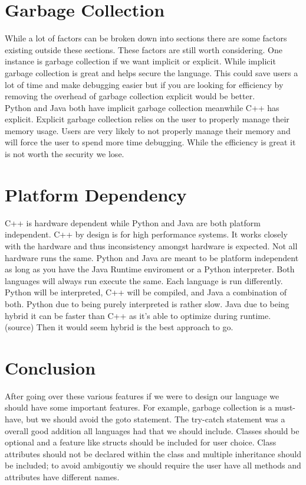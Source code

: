 \documentclass[sigconf, nonacm, authorversion, language=english, 12pt]{acmart}
\def\tab{\hspace*{5mm}}
\begin{document}
\section{Garbage Collection}

\tab While a lot of factors can be broken down into sections there are some factors existing outside these sections. These
factors are still worth considering. One instance is garbage collection if we want implicit or explicit. While implicit
garbage collection is great and helps secure the language. This could save users a lot of time and make debugging easier
but if you are looking for efficiency by removing the overhead of garbage collection explicit would be better.\\

\tab Python and Java both have implicit garbage collection meanwhile C++ has explicit. Explicit garbage collection relies on
the user to properly manage their memory usage. Users are very likely to not properly manage their memory and will
force the user to spend more time debugging. While the efficiency is great it is not worth the security we lose.\\

\section{Platform Dependency}
\tab C++ is hardware dependent while Python and Java are both platform independent. C++ by design is for high performance systems. It works
closely with the hardware and thus inconsistency amongst hardware is expected. Not all hardware runs the same. Python and Java are meant to be platform independent as long as
you have the Java Runtime enviroment or a Python interpreter. Both languages will always run execute the same. Each language is run differently. Python will be interpreted, C++ will be
compiled, and Java a combination of both. Python due to being purely interpreted is rather slow. Java due to being hybrid it can be faster than C++ as it's able to optimize during runtime. (source)
Then it would seem hybrid is the best approach to go.\\



\section{Conclusion}
After going over these various features if we were to design our language we should have some important features. For example, garbage collection is a must-have, but we should avoid
the goto statement. The try-catch statement was a overall good addition all languages had that we should include. Classes should be optional and a feature like structs should be
included for user choice. Class attributes should not be declared within the class and multiple inheritance should be included; to avoid ambigoutiy we should require the user have
all methods and attributes have different names.
\end{document}
